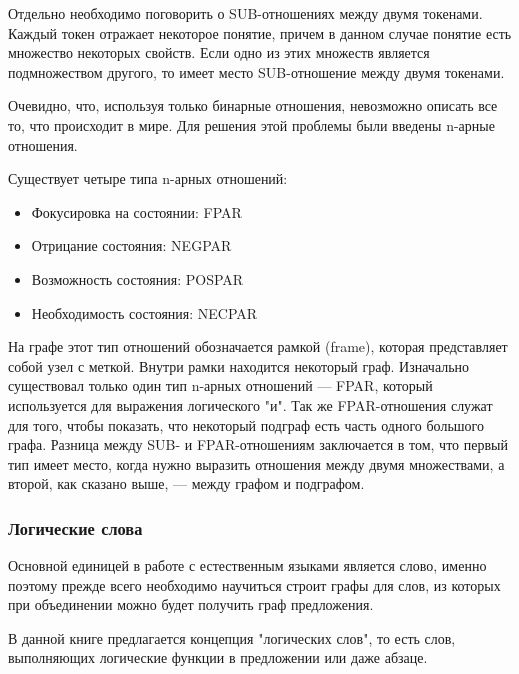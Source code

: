 Отдельно необходимо поговорить о SUB-отношениях между двумя токенами. Каждый токен отражает некоторое 
понятие, причем в данном случае понятие есть множество некоторых свойств. Если одно из этих  множеств 
является подмножеством другого, то имеет место SUB-отношение между двумя токенами.
 
Очевидно, что, используя только бинарные отношения, невозможно описать все то, что происходит в мире.
Для решения этой проблемы были введены n-арные отношения. 

Существует четыре типа n-арных отношений:

\begin {itemize}

\item{
Фокусировка на состоянии: FPAR
}

\item{
Отрицание состояния: NEGPAR
}

\item{
Возможность состояния: POSPAR 
}

\item{
Необходимость состояния: NECPAR
}
\end{itemize}

На графе этот тип отношений обозначается рамкой (frame), которая представляет собой  узел с меткой. Внутри рамки %
находится некоторый граф.
Изначально существовал только один тип n-арных отношений --- FPAR, который используется для выражения логического "и".
Так же FPAR-отношения служат для того, чтобы показать, что некоторый подграф есть часть одного большого графа. Разница
между SUB- и FPAR-отношениям заключается в том, что первый тип имеет место, когда нужно выразить отношения между двумя
множествами, а второй, как сказано выше, --- между графом и подграфом.

 

\subsubsection {Логические слова}
Основной единицей в работе с естественным языками является слово, именно поэтому прежде всего необходимо научиться 
строит графы для слов, из которых при объединении можно будет получить граф предложения.

В данной книге предлагается концепция "логических слов", то есть слов, выполняющих логические функции в предложении
или даже абзаце.

